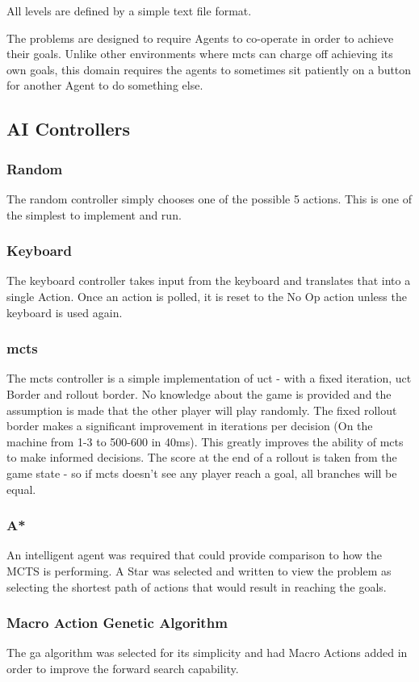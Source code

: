 \documentclass{IEEEtran}
\begin{document}
All levels are defined by a simple text file format.

The problems are designed to require Agents to co-operate in order to achieve their goals. Unlike other environments where \gls{mcts} can charge off achieving its own goals, this domain requires the agents to sometimes sit patiently on a button for another Agent to do something else.

\subsection{AI Controllers}
\subsubsection{Random}
The random controller simply chooses one of the possible 5 actions. This is one of the simplest to implement and run.
\subsubsection{Keyboard}
The keyboard controller takes input from the keyboard and translates that into a single Action. Once an action is polled, it is reset to the No Op action unless the keyboard is used again. 
\subsubsection{\gls{mcts}}
The \gls{mcts} controller is a simple implementation of \gls{uct} - with a fixed iteration, \gls{uct} Border and rollout border. No knowledge about the game is provided and the assumption is made that the other player will play randomly. The fixed rollout border makes a significant improvement in iterations per decision (On the machine from 1-3 to 500-600 in 40ms). This greatly improves the ability of \gls{mcts} to make informed decisions. The score at the end of a rollout is taken from the game state - so if \gls{mcts} doesn't see any player reach a goal, all branches will be equal.
\subsubsection{A*}
An intelligent agent was required that could provide comparison to how the MCTS is performing. A Star was selected and written to view the problem as selecting the shortest path of actions that would result in reaching the goals.
\subsubsection{Macro Action Genetic Algorithm}
The \gls{ga} algorithm was selected for its simplicity and had Macro Actions added in order to improve the forward search capability.
\end{document}

